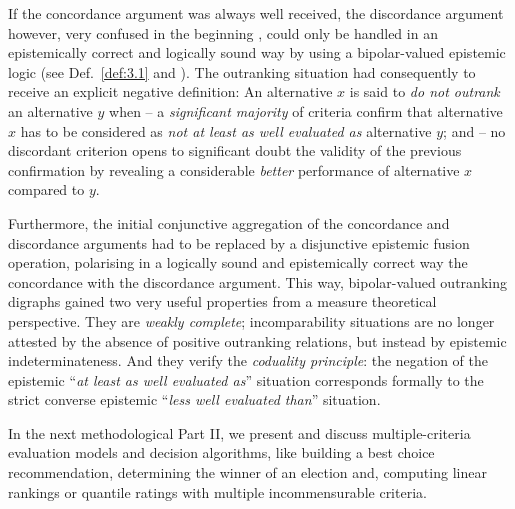 If the concordance argument was always well received, the discordance argument however, very confused in the beginning \citep{ROY-1966}, could only be handled in an epistemically correct and logically sound way by using a bipolar-valued epistemic logic (see Def.~\vref{def:3.1} and \citealp{BIS-2013}). The outranking situation had consequently to receive an explicit negative definition: An alternative $x$ is said to \emph{do not outrank} an alternative $y$ when – a \emph{significant majority} of criteria confirm that alternative $x$ has to be considered as \emph{not at least as well evaluated as} alternative $y$; and – no discordant criterion opens to significant doubt the validity of the previous confirmation by revealing a considerable \emph{better} performance of alternative $x$ compared to $y$.

Furthermore, the initial conjunctive aggregation of the concordance and discordance arguments had to be replaced by a disjunctive epistemic fusion operation, polarising in a logically sound and epistemically correct way the concordance with the discordance argument. This way, bipolar-valued outranking  digraphs gained two very useful properties from a measure theoretical perspective. They are \emph{weakly complete}; incomparability situations are no longer attested by the absence of positive outranking relations, but instead by epistemic indeterminateness. And they verify the \emph{coduality principle}: the negation of the epistemic ``\emph{at least as well evaluated as}'' situation corresponds formally to the strict converse epistemic ``\emph{less well evaluated than}'' situation.

\vspace{\baselineskip}
In the next methodological Part II, we present and discuss multiple-criteria evaluation models and decision algorithms, like building a best choice recommendation, determining the winner of an election and, computing linear rankings or quantile ratings with multiple incommensurable criteria.


%
%
